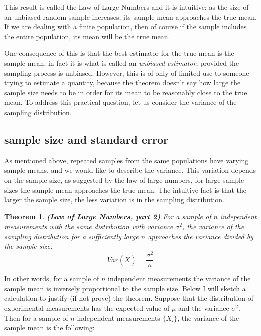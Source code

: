 \documentclass[
]{book}
\newtheorem{theorem}{Theorem}[chapter]
\theoremstyle{definition}
\theoremstyle{definition}
\theoremstyle{definition}
\theoremstyle{remark}
\begin{document}
This result is called the Law of Large Numbers and it is intuitive: as the size of an unbiased random sample increases, its sample mean approaches the true mean. If we are dealing with a finite population, then of course if the sample includes the entire population, its mean will be the true mean.

One consequence of this is that the best estimator for the true mean is the sample mean; in fact it is what is called an \emph{unbiased estimator}, provided the sampling process is unbiased. However, this is of only of limited use to someone trying to estimate a quantity, because the theorem doesn't say how large the sample size needs to be in order for its mean to be reasonably close to the true mean. To address this practical question, let us consider the variance of the sampling distribution.

\hypertarget{sample-size-and-standard-error}{%
\subsection{sample size and standard error}\label{sample-size-and-standard-error}}

As mentioned above, repeated samples from the same populations have varying sample means, and we would like to describe the variance. This variation depends on the sample size, as suggested by the law of large numbers, for large sample sizes the sample mean approaches the true mean. The intuitive fact is that the larger the sample size, the less variation is in the sampling distribution.

\begin{theorem}
\protect\hypertarget{thm:LLN2}{}{\label{thm:LLN2} }\textbf{(Law of Large Numbers, part 2)} For a sample of \(n\) independent measurements with the same distribution with variance \(\sigma^2\), the variance of the sampling distribution for a sufficiently large \(n\) approaches the variance divided by the sample size:
\[ Var(\bar X) = \frac{\sigma^2}{n}\]
\end{theorem}

In other words, for a sample of \(n\) independent measurements the variance of the sample mean is inversely proportional to the sample size. Below I will sketch a calculation to justify (if not prove) the theorem. Suppose that the distribution of experimental measurements has the expected value of \(\mu\) and the variance \(\sigma^2\). Then for a sample of \(n\) independent measurements \(\{X_i\}\), the variance of the sample mean is the following:
\end{document}
